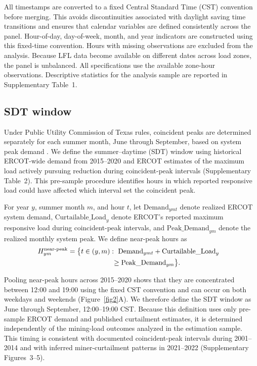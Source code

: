 \documentclass[pdflatex,sn-mathphys-num]{sn-jnl}%
\theoremstyle{thmstyleone}%
\theoremstyle{thmstyletwo}%
\theoremstyle{thmstylethree}%
\begin{document}
All timestamps are converted to a fixed Central Standard Time (CST) convention before merging. This avoids discontinuities associated with daylight saving time transitions and ensures that calendar variables are defined consistently across the panel. Hour-of-day, day-of-week, month, and year indicators are constructed using this fixed-time convention. Hours with missing observations are excluded from the analysis. Because LFL data become available on different dates across load zones, the panel is unbalanced. All specifications use the available zone-hour observations. Descriptive statistics for the analysis sample are reported in Supplementary Table~1.

\subsection*{SDT window}

Under Public Utility Commission of Texas rules, coincident peaks are determined separately for each summer month, June through September, based on system peak demand \cite{PUCT1999_25_192}. We define the summer--daytime (SDT) window using historical ERCOT-wide demand from 2015--2020 and ERCOT estimates of the maximum load actively pursuing reduction during coincident-peak intervals (Supplementary Table~2). This pre-sample procedure identifies hours in which reported responsive load could have affected which interval set the coincident peak.

For year $y$, summer month $m$, and hour $t$, let $\text{Demand}_{ymt}$ denote realized ERCOT system demand, $\text{Curtailable\_Load}_{y}$ denote ERCOT's reported maximum responsive load during coincident-peak intervals, and $\text{Peak\_Demand}_{ym}$ denote the realized monthly system peak. We define near-peak hours as
\begin{equation}
\begin{split}
H^{\text{near-peak}}_{ym}
&= \bigl\{ t \in (y,m) :
\ \text{Demand}_{ymt} + \text{Curtailable\_Load}_y \\
&\hphantom{= \bigl\{ t \in (y,m) :} \ge \text{Peak\_Demand}_{ym} \bigr\}.
\end{split}
\end{equation}

Pooling near-peak hours across 2015--2020 shows that they are concentrated between 12{:}00 and 19{:}00 using the fixed CST convention and can occur on both weekdays and weekends (Figure~\ref{fig2}A). We therefore define the SDT window as June through September, 12{:}00--19{:}00 CST. Because this definition uses only pre-sample ERCOT demand and published curtailment estimates, it is determined independently of the mining-load outcomes analyzed in the estimation sample. This timing is consistent with documented coincident-peak intervals during 2001--2014 and with inferred miner-curtailment patterns in 2021--2022 (Supplementary Figures~3--5).
\end{document}
